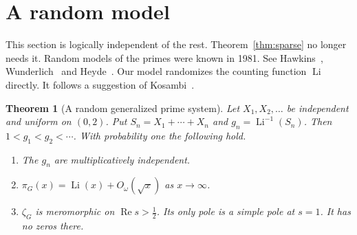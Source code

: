 \documentclass[12pt,letterpaper]{article}
\newtheorem{theorem}{Theorem}[section]
\theoremstyle{definition}
\theoremstyle{remark}
\numberwithin{equation}{section}
\newcommand{\Li}{\operatorname{Li}}
\newcommand{\Ree}{\operatorname{Re}}
\begin{document}
\section{A random model}\label{sec:random}

This section is logically independent of the rest. Theorem~\ref{thm:sparse}
no longer needs it. Random models of the primes were known in 1981. See
Hawkins~\cite{Ha58}, Wunderlich~\cite{Wu74} and
Heyde~\cite{He78}. Our model randomizes the counting function
$\Li$ directly. It follows a suggestion of Kosambi~\cite{Ko59}.

\begin{theorem}[A random generalized prime system]\label{thm:random}
Let $X_1,X_2,\dots$ be independent and uniform on $(0,2)$. Put
$S_n=X_1+\cdots+X_n$ and $g_n=\Li^{-1}(S_n)$. Then $1<g_1<g_2<\cdots$.
With probability one the following hold.
\begin{enumerate}[label=(\roman*)]
\item The $g_n$ are multiplicatively independent.
\item $\pi_G(x)=\Li(x)+O_\omega(\sqrt{x})$ as $x\to\infty$.
\item $\zeta_G$ is meromorphic on $\Ree s>\frac12$. Its only pole is a
  simple pole at $s=1$. It has no zeros there.
\end{enumerate}
\end{theorem}
\end{document}
